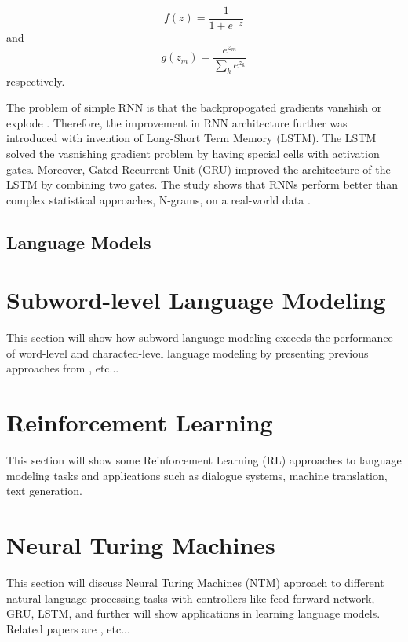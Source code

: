 \documentclass{IEEEtran}
\begin{document}
\begin{equation}
f(z) = \frac{1}{1+e^{-z}}
\end{equation}
and
\begin{equation}
g(z_m) = \frac{e^{z_m}}{\sum_k{e^{z_k}}}
\end{equation}
respectively.

The problem of simple RNN is that the backpropogated gradients vanshish or explode \cite{rnn}. Therefore, the improvement in RNN architecture further was introduced with invention of Long-Short Term Memory (LSTM). The LSTM solved the vasnishing gradient problem by having special cells with activation gates. Moreover, Gated Recurrent Unit (GRU) improved the architecture of the LSTM by combining two gates. The study shows that RNNs perform better than complex statistical approaches, N-grams, on a real-world data \cite{rnn}.

\subsection{Language Models}


\section{Subword-level Language Modeling}

This section will show how subword language modeling exceeds the performance of word-level and characted-level language modeling by presenting previous approaches from \cite{Mikolov2011SubwordLM}, etc...

\section{Reinforcement Learning}

This section will show some Reinforcement Learning (RL) approaches to language modeling tasks and applications such as dialogue systems, machine translation, text generation.

\section{Neural Turing Machines}

This section will discuss Neural Turing Machines (NTM) approach to different natural language processing tasks with controllers like feed-forward network, GRU, LSTM, and further will show applications in learning language models. Related papers are \cite{snips16}, etc...
\end{document}
